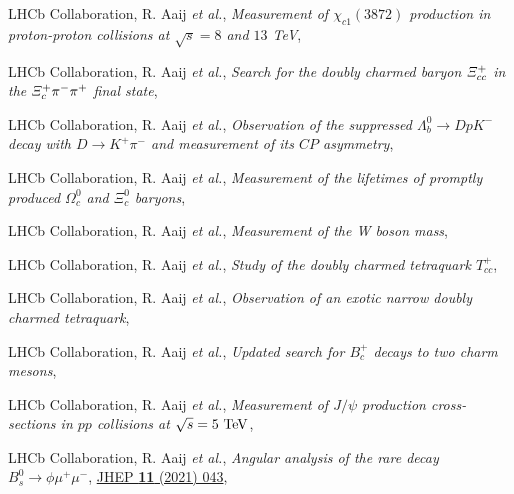 \begin{cvcontent}
\begin{enumerate}[label={[\arabic*]}, leftmargin=1.5cm]
    \item LHCb Collaboration, R. Aaij \emph{et al.}, 
    \emph{Measurement of $\chi_{c1}(3872)$ production in proton-proton collisions at $\sqrt{s}=8$ and $13$ TeV}, 
    \item LHCb Collaboration, R. Aaij \emph{et al.}, 
    \emph{Search for the doubly charmed baryon $\it{\Xi}_{cc}^{+}$ in the $\it{\Xi}_{c}^{+} \pi^{-} \pi^{+}$ final state}, 
    \item LHCb Collaboration, R. Aaij \emph{et al.}, 
    \emph{Observation of the suppressed $\Lambda_b^0\to D p K^-$ decay with $D\to K^+ \pi^-$ and measurement of its $C\!P$ asymmetry}, 
    \item LHCb Collaboration, R. Aaij \emph{et al.}, 
    \emph{Measurement of the lifetimes of promptly produced $\Omega^{0}_{c}$ and $\Xi^{0}_{c}$ baryons}, 
    \item LHCb Collaboration, R. Aaij \emph{et al.}, 
    \emph{Measurement of the W boson mass}, 
    \sloppy
    \item LHCb Collaboration, R. Aaij \emph{et al.}, 
    \emph{Study of the doubly charmed tetraquark $T_{cc}^+$}, 
    \item LHCb Collaboration, R. Aaij \emph{et al.}, 
    \emph{Observation of an exotic narrow doubly charmed tetraquark}, 
    \sloppy
    \item LHCb Collaboration, R. Aaij \emph{et al.}, 
    \emph{Updated search for $B_c^+$ decays to two charm mesons}, 
    \item LHCb Collaboration, R. Aaij \emph{et al.}, 
    \emph{Measurement of $J/\psi$ production cross-sections in $pp$ collisions at $\sqrt{s}=5~\rm{TeV}$},
  \end{enumerate}
  \begin{enumerate}[label={[\arabic*]}, leftmargin=1.5cm]
    \sloppy
    \item LHCb Collaboration, R. Aaij \emph{et al.}, 
    \emph{Angular analysis of the rare decay $B_s^0 \to \phi \mu^+ \mu^-$},
    \href{http://dx.doi.org/10.1007/JHEP11(2021)043}{JHEP \textbf{11} (2021) 043},
  \end{enumerate}
\end{cvcontent}
